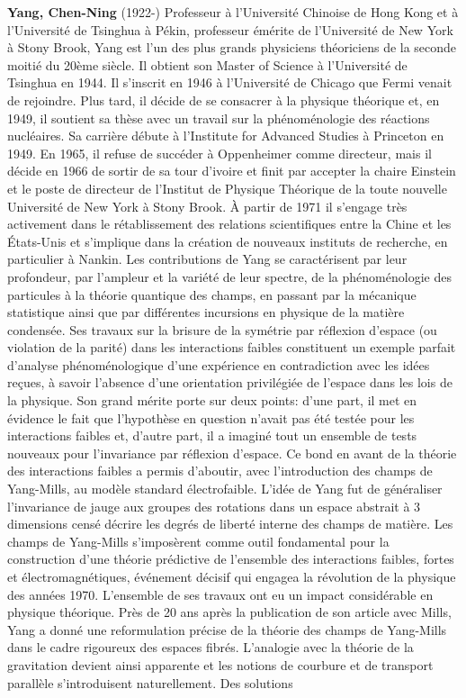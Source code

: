 \textbf{Yang, Chen-Ning} (1922-) Professeur à l'Université Chinoise de Hong Kong et à l'Université de Tsinghua à Pékin, professeur émérite de l'Université de New York à Stony Brook, Yang est l'un des plus grands physiciens théoriciens de la seconde moitié du 20ème siècle. Il obtient son Master of Science à l'Université de Tsinghua en 1944. Il s'inscrit en 1946 à l'Université de Chicago que Fermi venait de rejoindre. Plus tard, il décide de se consacrer à la physique théorique et, en 1949, il soutient sa thèse avec un travail sur la phénoménologie des réactions nucléaires. Sa carrière débute à l'Institute for Advanced Studies à Princeton en 1949. En 1965, il refuse de succéder à Oppenheimer comme directeur, mais il décide en 1966 de sortir de sa tour d'ivoire et finit par accepter la chaire Einstein et le poste de directeur de l'Institut de Physique Théorique de la toute nouvelle Université de New York à Stony Brook. À partir de 1971 il s'engage très activement dans le rétablissement des relations scientifiques entre la Chine et les États-Unis et s'implique dans la création de nouveaux instituts de recherche, en particulier à Nankin. Les contributions de Yang se caractérisent par leur profondeur, par l'ampleur et la variété de leur spectre, de la phénoménologie des particules à la théorie quantique des champs, en passant par la mécanique statistique ainsi que par différentes incursions en physique de la matière condensée. Ses travaux sur la brisure de la symétrie par réflexion d'espace (ou violation de la parité) dans les interactions faibles constituent un exemple parfait d'analyse phénoménologique d'une expérience en contradiction avec les idées reçues, à savoir l'absence d'une orientation privilégiée de l'espace dans les lois de la physique. Son grand mérite porte sur deux points: d'une part, il met en évidence le fait que l'hypothèse en question n'avait pas été testée pour les interactions faibles et, d'autre part, il a imaginé tout un ensemble de tests nouveaux pour l'invariance par réflexion d'espace. Ce bond en avant de la théorie des interactions faibles a permis d'aboutir, avec l'introduction des champs de Yang-Mills, au modèle standard électrofaible. L'idée de Yang fut de généraliser l'invariance de jauge aux groupes des rotations dans un espace abstrait à 3 dimensions censé décrire les degrés de liberté interne des champs de matière. Les champs de Yang-Mills s'imposèrent comme outil fondamental pour la construction d'une théorie prédictive de l'ensemble des interactions faibles, fortes et électromagnétiques, événement décisif qui engagea la révolution de la physique des années 1970. L'ensemble de ses travaux ont eu un impact considérable en physique théorique. Près de 20 ans après la publication de son article avec Mills, Yang a donné une reformulation précise de la théorie des champs de Yang-Mills dans le cadre rigoureux des espaces fibrés. L'analogie avec la théorie de la gravitation devient ainsi apparente et les notions de courbure et de transport parallèle s'introduisent naturellement. Des solutions 